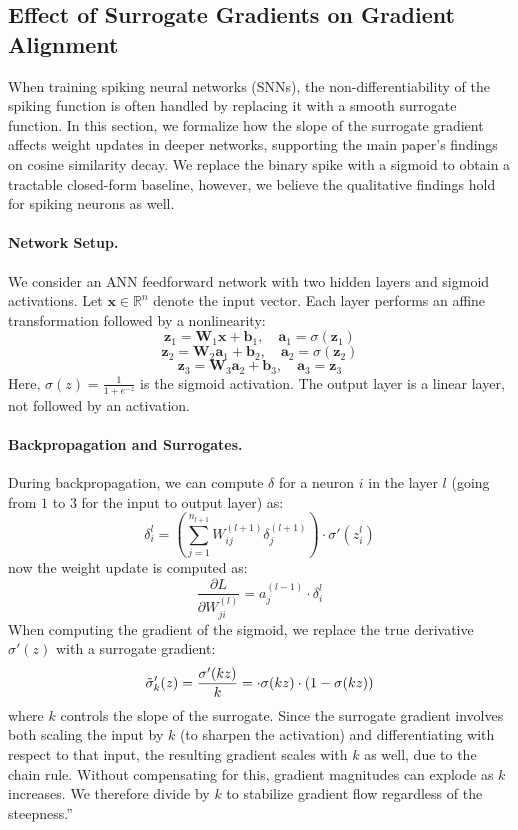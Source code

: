 \subsection{Effect of Surrogate Gradients on Gradient Alignment} \label{sup:surrgrad}

When training spiking neural networks (SNNs), the non-differentiability of the spiking function is often handled by replacing it with a smooth surrogate function. In this section, we formalize how the slope of the surrogate gradient affects weight updates in deeper networks, supporting the main paper’s findings on cosine similarity decay. We replace the binary spike with a sigmoid to obtain a tractable closed-form baseline, however, we believe the qualitative findings hold for spiking neurons as well.

\paragraph{Network Setup.}
We consider an ANN feedforward network with two hidden layers and sigmoid activations. Let \( \mathbf{x} \in \mathbb{R}^n \) denote the input vector. Each layer performs an affine transformation followed by a nonlinearity:
\[
\mathbf{z}_1 = \mathbf{W}_1 \mathbf{x} + \mathbf{b}_1, \quad \mathbf{a}_1 = \sigma(\mathbf{z}_1)
\]
\[
\mathbf{z}_2 = \mathbf{W}_2 \mathbf{a}_1 + \mathbf{b}_2, \quad \mathbf{a}_2 = \sigma(\mathbf{z}_2)
\]
\[
\mathbf{z}_3 = \mathbf{W}_3 \mathbf{a}_2 + \mathbf{b}_3, \quad \mathbf{a}_3 = \mathbf{z}_3
\]
Here, \( \sigma(z) = \frac{1}{1 + e^{-z}} \) is the sigmoid activation. The output layer is a linear layer, not followed by an activation.

\paragraph{Backpropagation and Surrogates.}
During backpropagation, we can compute \(\delta\) for a neuron \( i \) in the layer \( l \) (going from $1$ to $3$ for the input to output layer) as:
\[
\delta^l_i = \left( \sum_{j=1}^{n_{l+1}} W^{(l+1)}_{ij} \delta^{(l+1)}_j \right) \cdot \sigma'(z^l_i)
\]
now the weight update is computed as:
\[
\frac{\partial L}{\partial W^{(l)}_{ji}} = a^{(l-1)}_j \cdot \delta^l_i
\]
When computing the gradient of the sigmoid, we replace the true derivative \( \sigma'(z) \) with a surrogate gradient:
\[
\Tilde{\sigma}'_k(z) = \frac{\sigma'(kz)}{k} =\cdot \sigma(kz) \cdot (1 - \sigma(kz))
\]
where \( k \) controls the slope of the surrogate.  Since the surrogate gradient involves both scaling the input by $k$ (to sharpen the activation) and differentiating with respect to that input, the resulting gradient scales with $k$ as well, due to the chain rule. Without compensating for this, gradient magnitudes can explode as $k$ increases. We therefore divide by $k$ to stabilize gradient flow regardless of the steepness.”

